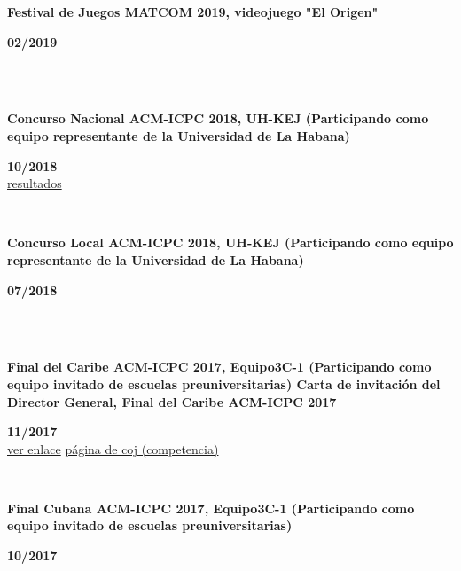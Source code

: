 \documentclass{article}
\begin{document}
\begin{minipage}{0.8\textwidth}
\parbox{0.8\linewidth}{\textbf{Festival de Juegos MATCOM 2019, videojuego "El Origen"}} \hfill \textbf{02/2019}\\
\\
\end{minipage}\\
\begin{minipage}{0.8\textwidth}
\parbox{0.8\linewidth}{\textbf{Concurso Nacional ACM-ICPC 2018, UH-KEJ (Participando como equipo representante de la Universidad de La Habana)} }\hfill \textbf{10/2018}\\
\href{https://icpc.global/regionals/finder/cnc-2018/standings}{resultados}
\\
\end{minipage} \hfill {}\\
\begin{minipage}{0.8\textwidth}
\parbox{0.8\linewidth}{\textbf{Concurso Local ACM-ICPC 2018, UH-KEJ (Participando como equipo representante de la Universidad de La Habana)}} \hfill \textbf{07/2018}\\
\\
\end{minipage} \hfill {}\\
\begin{minipage}{0.8\textwidth}
\parbox{0.8\linewidth}{\textbf{Final del Caribe ACM-ICPC 2017, Equipo3C-1 (Participando como equipo invitado de escuelas preuniversitarias)
Carta de invitación del Director General, Final del Caribe ACM-ICPC 2017}} \hfill \textbf{11/2017}\\
\href{https://matcomgrader.com/post/5167/the-2017-acm-icpc-caribbean-finals}{ver enlace}
\href{https://coj-forum.uci.cu/viewtopic.php?t=3315}{página de coj (competencia)}
\\
\end{minipage} \hfill {}\\
\begin{minipage}{0.8\textwidth}
\parbox{0.8\linewidth}{\textbf{Final Cubana ACM-ICPC 2017, Equipo3C-1 (Participando como equipo invitado de escuelas preuniversitarias)}} \hfill \textbf{10/2017}\\
\\
\end{minipage}\\
\end{document}
